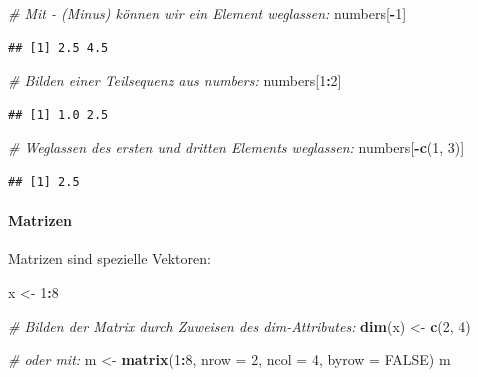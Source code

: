 \documentclass[
]{article}
\newenvironment{Shaded}{\begin{snugshade}}{\end{snugshade}}
\newcommand{\AttributeTok}[1]{\textcolor[rgb]{0.13,0.29,0.53}{#1}}
\newcommand{\CommentTok}[1]{\textcolor[rgb]{0.56,0.35,0.01}{\textit{#1}}}
\newcommand{\ConstantTok}[1]{\textcolor[rgb]{0.56,0.35,0.01}{#1}}
\newcommand{\DecValTok}[1]{\textcolor[rgb]{0.00,0.00,0.81}{#1}}
\newcommand{\FunctionTok}[1]{\textcolor[rgb]{0.13,0.29,0.53}{\textbf{#1}}}
\newcommand{\NormalTok}[1]{#1}
\newcommand{\OtherTok}[1]{\textcolor[rgb]{0.56,0.35,0.01}{#1}}
\newcommand{\SpecialCharTok}[1]{\textcolor[rgb]{0.81,0.36,0.00}{\textbf{#1}}}
\begin{document}
\begin{Shaded}
\begin{Highlighting}[]
\CommentTok{\# Mit {-} (Minus) können wir ein Element weglassen:}
\NormalTok{numbers[}\SpecialCharTok{{-}}\DecValTok{1}\NormalTok{]}
\end{Highlighting}
\end{Shaded}

\begin{verbatim}
## [1] 2.5 4.5
\end{verbatim}

\begin{Shaded}
\begin{Highlighting}[]
\CommentTok{\# Bilden einer Teilsequenz aus numbers:}
\NormalTok{numbers[}\DecValTok{1}\SpecialCharTok{:}\DecValTok{2}\NormalTok{]}
\end{Highlighting}
\end{Shaded}

\begin{verbatim}
## [1] 1.0 2.5
\end{verbatim}

\begin{Shaded}
\begin{Highlighting}[]
\CommentTok{\# Weglassen des ersten und dritten Elements weglassen:}
\NormalTok{numbers[}\SpecialCharTok{{-}}\FunctionTok{c}\NormalTok{(}\DecValTok{1}\NormalTok{, }\DecValTok{3}\NormalTok{)]}
\end{Highlighting}
\end{Shaded}

\begin{verbatim}
## [1] 2.5
\end{verbatim}

\hypertarget{matrizen}{%
\paragraph{Matrizen}\label{matrizen}}

Matrizen sind spezielle Vektoren:

\begin{Shaded}
\begin{Highlighting}[]
\NormalTok{x }\OtherTok{\textless{}{-}} \DecValTok{1}\SpecialCharTok{:}\DecValTok{8}

\CommentTok{\# Bilden der Matrix durch Zuweisen des dim{-}Attributes:}
\FunctionTok{dim}\NormalTok{(x) }\OtherTok{\textless{}{-}} \FunctionTok{c}\NormalTok{(}\DecValTok{2}\NormalTok{, }\DecValTok{4}\NormalTok{)}

\CommentTok{\# oder mit:}
\NormalTok{m }\OtherTok{\textless{}{-}} \FunctionTok{matrix}\NormalTok{(}\DecValTok{1}\SpecialCharTok{:}\DecValTok{8}\NormalTok{, }\AttributeTok{nrow =} \DecValTok{2}\NormalTok{, }\AttributeTok{ncol =} \DecValTok{4}\NormalTok{, }\AttributeTok{byrow =} \ConstantTok{FALSE}\NormalTok{)}
\NormalTok{m}
\end{Highlighting}
\end{Shaded}
\end{document}
